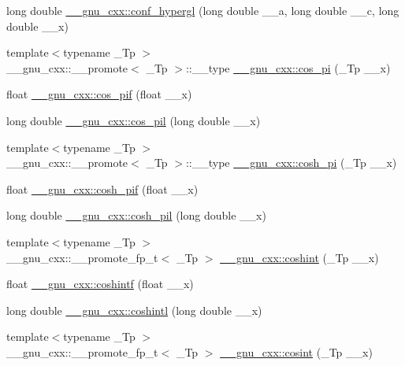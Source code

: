 \begin{DoxyCompactItemize}
long double \hyperlink{group__gnu__math__spec__func_ga0a9853f30d8fa515a12cd45a92da832e}{\+\_\+\+\_\+gnu\+\_\+cxx\+::conf\+\_\+hypergl} (long double \+\_\+\+\_\+a, long double \+\_\+\+\_\+c, long double \+\_\+\+\_\+x)
\item 
{\footnotesize template$<$typename \+\_\+\+Tp $>$ }\\\+\_\+\+\_\+gnu\+\_\+cxx\+::\+\_\+\+\_\+promote$<$ \+\_\+\+Tp $>$\+::\+\_\+\+\_\+type \hyperlink{group__gnu__math__spec__func_ga5ebda736a00921a739ed657cab0643ec}{\+\_\+\+\_\+gnu\+\_\+cxx\+::cos\+\_\+pi} (\+\_\+\+Tp \+\_\+\+\_\+x)
\item 
float \hyperlink{group__gnu__math__spec__func_gaddcae99c1572af6fa1d79b9cfa053033}{\+\_\+\+\_\+gnu\+\_\+cxx\+::cos\+\_\+pif} (float \+\_\+\+\_\+x)
\item 
long double \hyperlink{group__gnu__math__spec__func_ga9b6816c0abf30fd88417d79a33cb5465}{\+\_\+\+\_\+gnu\+\_\+cxx\+::cos\+\_\+pil} (long double \+\_\+\+\_\+x)
\item 
{\footnotesize template$<$typename \+\_\+\+Tp $>$ }\\\+\_\+\+\_\+gnu\+\_\+cxx\+::\+\_\+\+\_\+promote$<$ \+\_\+\+Tp $>$\+::\+\_\+\+\_\+type \hyperlink{group__gnu__math__spec__func_ga4400f758578400b7a10f8202f854c8b4}{\+\_\+\+\_\+gnu\+\_\+cxx\+::cosh\+\_\+pi} (\+\_\+\+Tp \+\_\+\+\_\+x)
\item 
float \hyperlink{group__gnu__math__spec__func_ga79a2f5c9da96b5ea6c663d6efca24944}{\+\_\+\+\_\+gnu\+\_\+cxx\+::cosh\+\_\+pif} (float \+\_\+\+\_\+x)
\item 
long double \hyperlink{group__gnu__math__spec__func_gab7bf4f591dd35af2bdb88a8219f5e248}{\+\_\+\+\_\+gnu\+\_\+cxx\+::cosh\+\_\+pil} (long double \+\_\+\+\_\+x)
\item 
{\footnotesize template$<$typename \+\_\+\+Tp $>$ }\\\+\_\+\+\_\+gnu\+\_\+cxx\+::\+\_\+\+\_\+promote\+\_\+fp\+\_\+t$<$ \+\_\+\+Tp $>$ \hyperlink{group__gnu__math__spec__func_ga901c23871fded7d4467a864fe06bbf07}{\+\_\+\+\_\+gnu\+\_\+cxx\+::coshint} (\+\_\+\+Tp \+\_\+\+\_\+x)
\item 
float \hyperlink{group__gnu__math__spec__func_ga1af4d48209169967a836bd97e625a128}{\+\_\+\+\_\+gnu\+\_\+cxx\+::coshintf} (float \+\_\+\+\_\+x)
\item 
long double \hyperlink{group__gnu__math__spec__func_ga6d24ab53fad13d421f07d9a9a509de14}{\+\_\+\+\_\+gnu\+\_\+cxx\+::coshintl} (long double \+\_\+\+\_\+x)
\item 
{\footnotesize template$<$typename \+\_\+\+Tp $>$ }\\\+\_\+\+\_\+gnu\+\_\+cxx\+::\+\_\+\+\_\+promote\+\_\+fp\+\_\+t$<$ \+\_\+\+Tp $>$ \hyperlink{group__gnu__math__spec__func_ga06eed76a045a73ad72fcf4ad00b05f96}{\+\_\+\+\_\+gnu\+\_\+cxx\+::cosint} (\+\_\+\+Tp \+\_\+\+\_\+x)

\end{DoxyCompactItemize}
